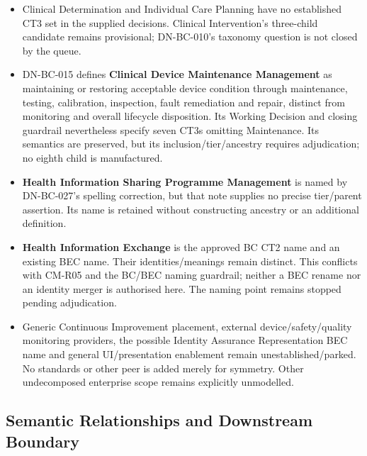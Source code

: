 \begin{itemize}

\item 
Clinical Determination and Individual Care Planning have no established CT3 set in the supplied decisions. Clinical Intervention’s three-child candidate remains provisional; DN-BC-010’s taxonomy question is not closed by the queue.



\item 
DN-BC-015 defines \textbf{Clinical Device Maintenance Management} as maintaining or restoring acceptable device condition through maintenance, testing, calibration, inspection, fault remediation and repair, distinct from monitoring and overall lifecycle disposition. Its Working Decision and closing guardrail nevertheless specify seven CT3s omitting Maintenance. Its semantics are preserved, but its inclusion/\allowbreak{}tier/\allowbreak{}ancestry requires adjudication; no eighth child is manufactured.



\item 
\textbf{Health Information Sharing Programme Management} is named by DN-BC-027’s spelling correction, but that note supplies no precise tier/\allowbreak{}parent assertion. Its name is retained without constructing ancestry or an additional definition.



\item 
\textbf{Health Information Exchange} is the approved BC CT2 name and an existing BEC name. Their identities/\allowbreak{}meanings remain distinct. This conflicts with CM-R05 and the BC/\allowbreak{}BEC naming guardrail; neither a BEC rename nor an identity merger is authorised here. The naming point remains stopped pending adjudication.



\item 
Generic Continuous Improvement placement, external device/\allowbreak{}safety/\allowbreak{}quality monitoring providers, the possible Identity Assurance Representation BEC name and general UI/\allowbreak{}presentation enablement remain unestablished/\allowbreak{}parked. No standards or other peer is added merely for symmetry. Other undecomposed enterprise scope remains explicitly unmodelled.



\end{itemize}
\label{rad:business:1235}
\subsection*{Semantic Relationships and Downstream Boundary}
\label{rad:business:1237}



